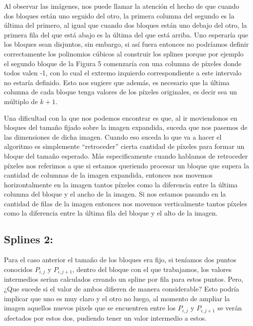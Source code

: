 \documentclass[a4paper]{article}
\newcounter{col}
\begin{document}
Al observar las imágenes, nos puede llamar la atención el hecho de que cuando dos bloques están uno seguido del otro, la primera columna del segundo es la última del primero, al igual que cuando dos bloques están uno debajo del otro, la primera fila del que está abajo es la última del que está arriba. Uno esperaría que los bloques sean disjuntos, sin embargo, si así fuera entonces no podríamos definir correctamente los polinomios cúbicos al construir los splines porque por ejemplo el segundo bloque de la Figura 5 comenzaría con una columna de píxeles donde todos valen -1, con lo cual el extremo izquierdo correspondiente a este intervalo no estaría definido. Esto nos sugiere que además, es necesario que la última columna de cada bloque tenga valores de los píxeles originales, es decir sea un múltiplo de $k + 1$.
\par Una dificultad con la que nos podemos encontrar es que, al ir moviendonos en bloques del tamaño fijado sobre la imagen expandida, suceda que nos pasemos de las dimensiones de dicha imagen. Cuando eso suceda lo que va a hacer el algoritmo es simplemente ``retroceder'' cierta cantidad de píxeles para formar un bloque del tamaño esperado. Más especificamente cuando hablamos de retroceder píxeles nos referimos a que si estamos queriendo procesar un bloque que supera la cantidad de columnas de la imagen expandida, entonces nos movemos horizontalmente en la imagen tantos píxeles como la diferencia entre la última columna del bloque y el ancho de la imagen. Si nos estamos pasando en la cantidad de filas de la imagen entonces nos movemos verticalmente tantos píxeles como la diferencia entre la última fila del bloque y el alto de la imagen.

\subsection{Splines 2:}

Para el caso anterior el tamaño de los bloques era fijo, si teníamos dos puntos conocidos $P_{i,j}$ y  $P_{i,j+1} $, dentro del bloque con el que trabajamos, los valores intermedios serian calculados creando un spline por fila para estos puntos. Pero, ¿Que sucede si el valor de ambos difieren de manera considerable? Esto podría implicar que uno es muy claro y el otro no luego, al momento de ampliar la imagen aquellos nuevos pixels que se encuentren entre los $ P_{i,j} $ y  $P_{i,j+1}$ se verán afectados por estos dos, pudiendo tener un valor intermedio a estos.  
 
\end{document}
